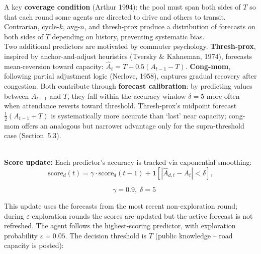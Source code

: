A key \textbf{coverage condition} (Arthur 1994): the pool must span both sides of $T$ so that each round some agents are directed to drive and others to transit. Contrarian, cycle-$k$, avg-$n$, and thresh-prox produce a distribution of forecasts on both sides of $T$ depending on history, preventing systematic bias. \\

Two additional predictors are motivated by commuter psychology. \textbf{Thresh-prox}, inspired by anchor-and-adjust heuristics (Tversky \& Kahneman, 1974), forecasts mean-reversion toward capacity: $\hat{A}_t = T + 0.5(A_{t-1} - T)$. \textbf{Cong-mom}, following partial adjustment logic (Nerlove, 1958), captures gradual recovery after congestion. Both contribute through \textbf{forecast calibration}: by predicting values between $A_{t-1}$ and $T$, they fall within the accuracy window $\delta = 5$ more often when attendance reverts toward threshold. Thresh-prox's midpoint forecast $\frac{1}{2}(A_{t-1}+T)$ is systematically more accurate than `last' near capacity; cong-mom offers an analogous but narrower advantage only for the supra-threshold case (Section~5.3).

\\

\textbf{Score update:} Each predictor's accuracy is tracked via exponential smoothing: \\

$$
\text{score}_d(t) = \gamma \cdot \text{score}_d(t{-}1) + \mathbf{1}\!\left[|\hat{A}_{d,t} - A_t| < \delta\right], 
$$

$$
\quad \gamma = 0.9,\; \delta = 5
$$

This update uses the forecasts from the most recent non-exploration round; during $\varepsilon$-exploration rounds the scores are updated but the active forecast is not refreshed. The agent follows the highest-scoring predictor, with exploration probability $\varepsilon = 0.05$. The decision threshold is $T$ (public knowledge -- road capacity is posted): \\

